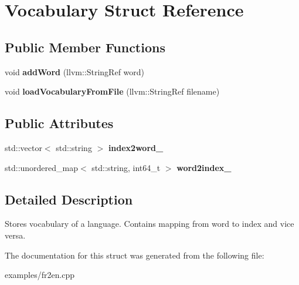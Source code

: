 \hypertarget{struct_vocabulary}{}\section{Vocabulary Struct Reference}
\label{struct_vocabulary}
\subsection*{Public Member Functions}
\begin{DoxyCompactItemize}
\item 
\mbox{\label{struct_vocabulary_a4e8abb56add8b240acba266f9cdedead}} 
void {\bfseries add\+Word} (llvm\+::\+String\+Ref word)
\item 
\mbox{\label{struct_vocabulary_a009a3e907c84f7492d6ed0570c4badc5}} 
void {\bfseries load\+Vocabulary\+From\+File} (llvm\+::\+String\+Ref filename)
\end{DoxyCompactItemize}
\subsection*{Public Attributes}
\begin{DoxyCompactItemize}
\item 
\mbox{\label{struct_vocabulary_a1e8cde58dc2c132fff02d2a51f78ecd4}} 
std\+::vector$<$ std\+::string $>$ {\bfseries index2word\+\_\+}
\item 
\mbox{\label{struct_vocabulary_a3f5a5c62d317191e60cbd7c35889ba5d}} 
std\+::unordered\+\_\+map$<$ std\+::string, int64\+\_\+t $>$ {\bfseries word2index\+\_\+}
\end{DoxyCompactItemize}


\subsection{Detailed Description}
Stores vocabulary of a language. Contains mapping from word to index and vice versa. 

The documentation for this struct was generated from the following file\+:\begin{DoxyCompactItemize}
\item 
examples/fr2en.\+cpp\end{DoxyCompactItemize}

